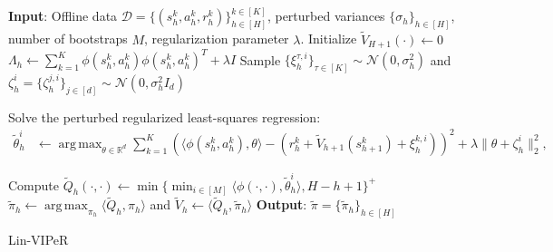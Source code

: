 \documentclass{article} \usepackage{iclr2023/iclr2023_conference,times}
\DeclareMathOperator*{\argmax}{arg\,max}
\begin{document}
\begin{algorithm}[h!]
\begin{algorithmic}[1]
\State \textbf{Input}: Offline data $ \mathcal{D} = \{(s_h^k, a_h^k, r_h^k)\}_{h \in [H]}^{k \in [K]} $, perturbed variances $\{\sigma_h\}_{h \in [H]}$, number of bootstraps $M$, regularization parameter $\lambda$. 
\State Initialize $\tilde{V}_{H+1}(\cdot) \leftarrow 0$
\State $\Lambda_h \leftarrow \sum_{k=1}^K \phi(s^k_h, a^k_h) \phi(s^k_h, a^k_h)^T + \lambda I$
\State Sample $\{\xi^{\tau, i}_h\}_{\tau \in [K]} \sim \mathcal{N}(0, \sigma^2_h)$ and $\zeta^i_h = \{\zeta^{j, i}_h\}_{j \in [d]} \sim \mathcal{N}(0, \sigma^2_h I_d)$


\State Solve the perturbed regularized least-squares regression: 
\label{RAVI-Lin: perturbed ERM}
\begin{align*}
   \tilde{\theta}^i_h &\leftarrow \argmax_{\theta \in \mathbb{R}^d} \sum_{k=1}^K \left(\langle \phi(s^k_h, a^k_h), \theta \rangle - (r^k_h + \tilde{V}_{h+1}(s^k_{h+1}) + \xi^{k,i}_h ) \right)^2 + \lambda \| \theta + \zeta^i_h \|_2^2, 
\end{align*}

\EndFor 

\State Compute $\tilde{Q}_h(\cdot, \cdot) \leftarrow \min \{\min_{i \in [M]} \langle \phi(\cdot, \cdot), \tilde{\theta}^i_h \rangle, H - h +1 \}^{+}$
\State $\tilde{\pi}_{h} \leftarrow \argmax_{\pi_{h}}\langle \tilde{Q}_{h}, \pi_{h} \rangle$ and $\tilde{V}_h \leftarrow \langle \tilde{Q}_{h}, \tilde{\pi}_{h} \rangle$
\EndFor
\State \textbf{Output}: $\tilde{\pi} = \{ \tilde{\pi}_h \}_{h \in [H]}$
\end{algorithmic}
\caption{Lin-VIPeR}
\label{algorithm: LinPER}
\end{algorithm}
\end{document}
